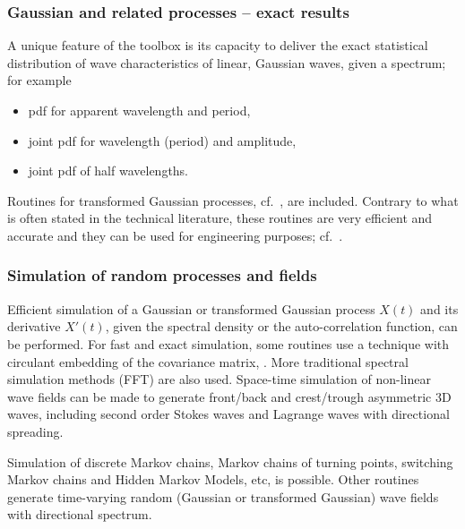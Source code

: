 \subsubsection{Gaussian and related processes -- exact results}
A unique feature of the \wf{} toolbox is its capacity to deliver the
exact statistical distribution of wave characteristics of linear, Gaussian waves, 
given a spectrum; for example
\begin{itemize}\setlength\itemsep{-1mm}
    \item pdf for apparent wavelength and period,
    \item joint pdf for wavelength (period) and amplitude,
    \item joint pdf of half wavelengths.
\end{itemize}
Routines for transformed Gaussian processes, cf.\
\cite{RychlikEtal1997Modelling}, %
are included. Contrary to what is often stated in the technical literature,
these routines are very efficient and accurate and they can be used for
engineering purposes; cf.\ \cite[Sec.\ 4.4.1]{Massel1996Ocean}. %

\subsubsection{Simulation of random processes and fields}
Efficient simulation of a Gaussian or transformed Gaussian process $X(t)$ and its
derivative $X'(t)$, given the spectral density or the
auto-correlation function, can be performed. 
For fast and exact simulation, some routines use
a technique with circulant embedding of the covariance matrix,
\cite{DietrichAndNewsam1997Fast}. %
More traditional spectral simulation methods (FFT) are also used. 
Space-time simulation of non-linear wave fields can be made to generate front/back and 
crest/trough asymmetric 3D waves, including second order Stokes waves and 
Lagrange waves with directional spreading. 

Simulation of discrete Markov
chains, Markov chains of turning points, switching Markov
chains and Hidden Markov Models, etc, is possible.
Other routines generate time-varying random (Gaussian or transformed
Gaussian) wave fields with directional spectrum.

